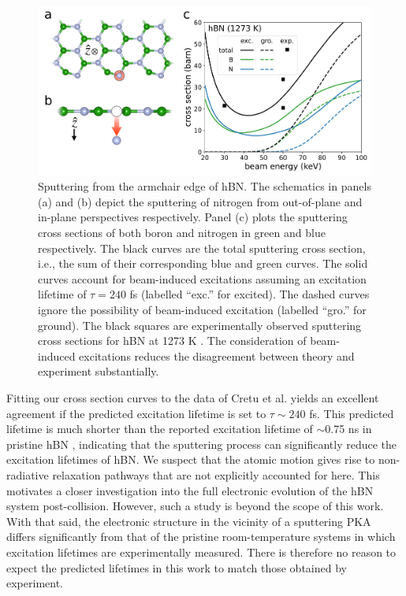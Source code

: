 \documentclass{article}
\begin{document}
\begin{figure} 
  \centering
  \includegraphics[width=\textwidth]{fig5.pdf}
  \caption{
    Sputtering from the armchair edge of hBN.
    The schematics in panels (a) and (b) depict the sputtering of nitrogen from
    out-of-plane and in-plane perspectives respectively.
    Panel (c) plots the sputtering cross sections of both boron and nitrogen in
    green and blue respectively.
    The black curves are the total sputtering cross section, i.e., the sum of
    their corresponding blue and green curves.
    The solid curves account for beam-induced excitations assuming an
    excitation lifetime of $\tau=240$ fs (labelled ``exc.'' for excited).
    The dashed curves ignore the possibility of beam-induced excitation
    (labelled ``gro.'' for ground).
    The black squares are experimentally observed sputtering cross sections
    for hBN at 1273 K \cite{Cretu2015}.
    The consideration of beam-induced excitations reduces the disagreement
    between theory and experiment substantially.
  }
  \label{fig:edgeCross}
\end{figure}

Fitting our cross section curves to the data of Cretu et al. yields an excellent
agreement if the predicted excitation lifetime is set to $\tau \sim 240$ fs.
This predicted lifetime is much shorter than the reported excitation lifetime
of $\sim$0.75 ns in pristine hBN \cite{Li2016b}, indicating that the sputtering
process can significantly reduce the excitation lifetimes of hBN.
We suspect that the atomic motion gives rise to non-radiative relaxation
pathways that are not explicitly accounted for here. 
This motivates a closer investigation into the full electronic evolution of
the hBN system post-collision.
However, such a study is beyond the scope of this work.
With that said, the electronic structure in the vicinity of a sputtering PKA
differs significantly from that of the pristine room-temperature systems in
which excitation lifetimes are experimentally measured.
There is therefore no reason to expect the predicted lifetimes in this
work to match those obtained by experiment.
\end{document}

